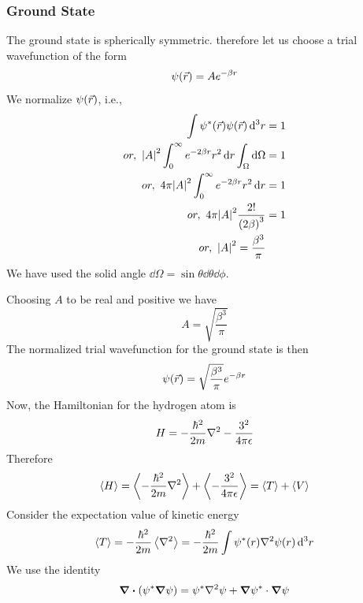 	\subsubsection{Ground State}
	The ground state is spherically symmetric. therefore let us choose a trial wavefunction of the form
	\begin{align}
		\psi\qty(\vec{r}) = A e^{-\beta r}
	\end{align}
	We normalize $\psi\qty(\vec{r})$, i.e.,
	\begin{align*}
		\int \psi^*\qty(\vec{r}) \psi\qty(\vec{r}) \dd[3]{r} &= 1 \\
		or, \ \abs{A}^2 \int_{0}^{\infty} e^{-2\beta r} r^2 \dd{r} \int_{\Omega} \dd{\Omega} &= 1 \\
		or, \ 4\pi \abs{A}^2 \int_{0}^{\infty} e^{-2\beta r} r^2 \dd{r} &= 1 \\
		or, \ 4\pi \abs{A}^2 \frac{2 !}{\qty(2\beta)^3} &= 1 \\
		or, \ \abs{A}^2 = \frac{\beta^3}{\pi}
	\end{align*}
	We have used the solid angle $\dd{\Omega} = \sin\theta \dd{\theta} \dd{\phi}$.
	
	Choosing $A$ to be real and positive we have
	\begin{equation}
		A = \sqrt{\frac{\beta^3}{\pi}}
	\end{equation}
	The normalized trial wavefunction for the ground state is then
	\begin{equation}
		\psi\qty(\vec{r}) = \sqrt{\frac{\beta^3}{\pi}} e ^{-\beta r}
	\end{equation}
	Now, the Hamiltonian for the hydrogen atom is
	\begin{align}
		H = - \frac{\hbar^2}{2 m} \laplacian{} - \frac{3^2}{4\pi\epsilon}
	\end{align}
	Therefore
	\begin{align}
		\expval{H} = \expval{- \frac{\hbar^2}{2 m} \laplacian{}}  + \expval{- \frac{3^2}{4\pi\epsilon}}  = \expval{T}  + \expval{V} 
	\end{align}
	Consider the expectation value of kinetic energy
	\begin{align}
		\expval{T}  =  - \frac{\hbar^2}{2 m}\expval{\laplacian{}} = - \frac{\hbar^2}{2 m} \int \psi^*\qty(r) \laplacian{\psi\qty(r)} \dd[3]{r}
	\end{align}
	We use the identity
	\begin{align}
		\divergence \qty(\psi^* \grad{\psi}) = \psi^*\laplacian{\psi} + \grad{\psi^*} \cdot \grad{\psi}
	\end{align}
	
